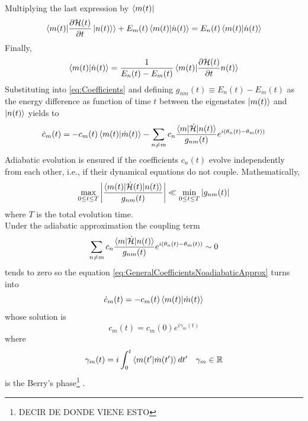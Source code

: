 Multiplying the last expression by $\bra{m(t)}$ 
\begin{equation}
    \braket{m(t)|\frac{\partial\mathcal{H}(t)}{\partial t}\ket{n(t)}} + E_{m}(t)\braket{m(t)|\dot{n}(t)} = E_{n}(t)\braket{m(t)|\dot{n}(t)}
\end{equation}
Finally,
\begin{equation}
    \braket{m(t)|\dot{n}(t)} = \frac{1}{E_{n}(t)-E_{m}(t)}\braket{m(t)|\frac{\partial \mathcal{H}(t)}{\partial t}n(t)}
\end{equation}
Substituting into \ref{eq:Coefficients} and defining $g_{nm}(t)\equiv E_{n}(t) - E_{m}(t)$ as the energy difference as function of time $t$ between the eigenstates $\ket{m(t)}$ and $\ket{n(t)}$ yields to
\begin{equation}
\label{eq:GeneralCoefficientsNoadiabaticApprox}
    \dot{c}_{m}(t) = -c_{m}(t) \braket{m(t)|\dot{m}(t)} - \sum_{n\neq m} c_{n}\frac{\braket{m|\dot{\mathcal{H}}|n(t)}}{g_{nm}(t)}e^{i\left(\theta_{n}(t) - \theta_{m}(t)\right)}
\end{equation}
Adiabatic evolution is ensured if the coefficients $c_{n}(t)$ evolve independently from each other, i.e., if their dynamical equations do not couple. Mathematically,
\begin{equation}
    \max_{0 \leq t \leq T} \abs{\frac{\braket{m(t)|\dot{\mathcal{H}}(t)|n(t)}}{g_{nm}(t)}} \ll \min_{0\leq t \leq T} \abs{g_{nm}(t)}
\end{equation}
where $T$ is the total evolution time.\\ 
Under the adiabatic approximation the coupling term
\begin{equation}
    \sum_{n\neq m} c_{n}\frac{\braket{m|\dot{\mathcal{H}}|n(t)}}{g_{nm}(t)}e^{i\left(\theta_{n}(t) - \theta_{m}(t)\right)} \sim 0
\end{equation}
tends to zero so the equation \ref{eq:GeneralCoefficientsNoadiabaticApprox} turns into
\begin{equation}
    \dot{c}_{m}(t) = -c_{m}(t)\braket{m(t)|\dot{m}(t)}
\end{equation}
whose solution is
\begin{equation}
    c_{m}(t) = c_{m}(0)e^{i\gamma_{m}(t)}
\end{equation}
where
\begin{equation}
    \gamma_{m}(t) = i\int_{0}^{t}\braket{m(t^{\prime}|\dot{m}(t^{\prime})}dt^{\prime} \quad \gamma_{m}\in \mathbb{R}
\end{equation}
is the Berry's phase\footnote{DECIR DE DONDE VIENE ESTO}   .
